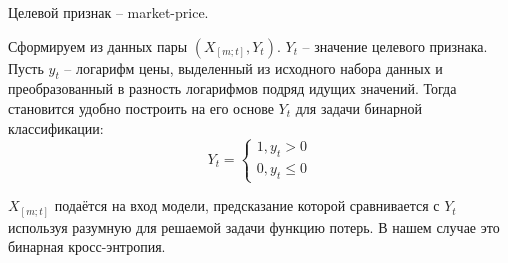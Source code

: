 \documentclass[diploma]{nanolab2015}
\begin{document}
Целевой признак -- market-price.

Сформируем из данных пары $(X_{[m;t]}, Y_{t})$. $Y_t$ -- значение целевого признака. Пусть $y_t$ -- логарифм цены, выделенный из исходного набора данных и преобразованный в разность логарифмов подряд идущих значений. Тогда становится удобно построить на его основе $Y_t$ для задачи бинарной классификации:
$$
    Y_t =
    \begin{cases}
        1, y_t > 0 \\
        0, y_t \le 0
    \end{cases}
$$

$X_{[m;t]}$ подаётся на вход модели, предсказание которой сравнивается с $Y_{t}$ используя разумную для решаемой задачи функцию потерь. В нашем случае это бинарная кросс-энтропия.

\renewcommand\theadalign{ll}
\end{document}
